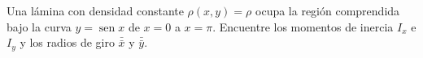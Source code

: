 \item Una lámina con densidad constante $\rho(x, y) = \rho$ ocupa la región comprendida bajo la curva $y = \operatorname{sen} x$ de $x = 0$ a $x = \pi$. Encuentre los momentos de inercia $I_x$ e $I_y$ y los radios de giro $\bar{\bar{x}}$ y $\bar{\bar{y}}$.
